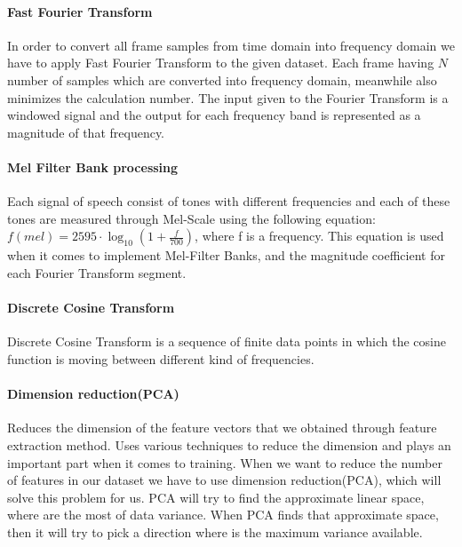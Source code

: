 \documentclass[english,12pt,oneside,a4paper]{article}
\begin{document}
		\paragraph{Fast Fourier Transform}
		In order to convert all frame samples from time domain into frequency domain we have to apply Fast Fourier Transform to the given dataset. Each frame having $N$ number of samples which are converted into frequency domain, meanwhile also minimizes the calculation number. The input given to the Fourier Transform is a windowed signal and the output for each frequency band is represented as a magnitude of that frequency.
		\paragraph{Mel Filter Bank processing}
		Each signal of speech consist of tones with different frequencies and each of these tones are measured through Mel-Scale using the following equation: $f(mel)=2595\cdot\log_{10}(1+\frac{f}{700})$, where f is a frequency. This equation is used when it comes to implement Mel-Filter Banks, and the magnitude coefficient for each Fourier Transform segment.
		\paragraph{Discrete Cosine Transform}
		Discrete Cosine Transform is a sequence of finite data points in which the cosine function is moving between different kind of frequencies.
		\paragraph{Dimension reduction(PCA)}
		Reduces the dimension of the feature vectors that we obtained through feature extraction method. Uses various techniques to reduce the dimension and plays an important part when it comes to training. When we want to reduce the number of features in our dataset we have to use dimension reduction(PCA), which will solve this problem for us. PCA will try to find the approximate linear space, where are the most of data variance. When PCA finds that approximate space, then it will try to pick a direction where is the maximum variance available.
\end{document}
